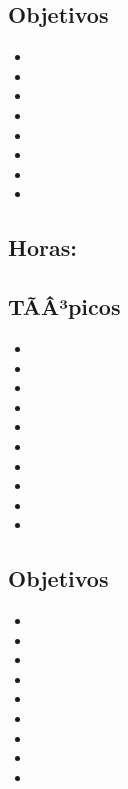 \subsection*{Objetivos}
\begin{itemize}
	\item \OSDOSObjUNO
	\item \OSDOSObjDOS
	\item \OSDOSObjTRES
	\item \OSDOSObjCUATRO
	\item \OSDOSObjCINCO
	\item \OSDOSObjSEIS
	\item \OSDOSObjSIETE
	\item \OSDOSObjOCHO
\end{itemize}

\subsection{\OSTRESDef}\label{sec:BOK-OS3}
\subsection*{Horas: \OSTRESHours}

\subsection*{TÃÂ³picos}
\begin{itemize}
	\item \OSTRESTopicEstados
	\item \OSTRESTopicEstructuras
	\item \OSTRESTopicDespachos
	\item \OSTRESTopicEl
	\item \OSTRESTopicEjecucion
	\item \OSTRESTopicElproblema
	\item \OSTRESTopicDeadlock
	\item \OSTRESTopicModelos
	\item \OSTRESTopicProblemas
	\item \OSTRESTopicProblemasde
\end{itemize}

\subsection*{Objetivos}
\begin{itemize}
	\item \OSTRESObjUNO
	\item \OSTRESObjDOS
	\item \OSTRESObjTRES
	\item \OSTRESObjCUATRO
	\item \OSTRESObjCINCO
	\item \OSTRESObjSEIS
	\item \OSTRESObjSIETE
	\item \OSTRESObjOCHO
	\item \OSTRESObjNUEVE
\end{itemize}

